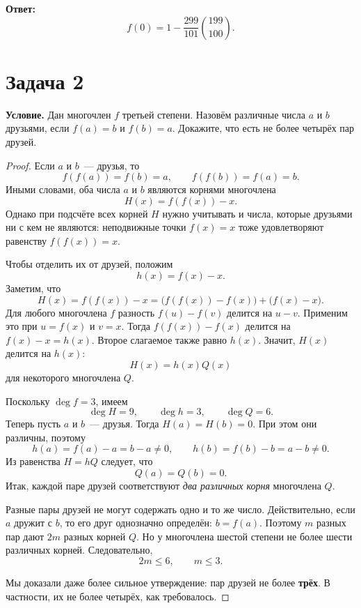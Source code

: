 \documentclass[12pt]{article}
\begin{document}
	\noindent
	\textbf{Ответ:}
	\[
		\boxed{f(0)=1-\frac{299}{101}\binom{199}{100}}.
	\]

	\section*{Задача 2}

	\noindent
	\textbf{Условие.} Дан многочлен $f$ третьей степени. Назовём различные
	числа $a$ и $b$ друзьями, если $f(a)=b$ и $f(b)=a$. Докажите, что есть
	не более четырёх пар друзей.

	\begin{proof}
		Если $a$ и $b$~--- друзья, то
		\[
			f(f(a))=f(b)=a,\qquad f(f(b))=f(a)=b.
		\]
		Иными словами, оба числа $a$ и $b$ являются корнями многочлена
		\[
			H(x)=f(f(x))-x.
		\]
		Однако при подсчёте всех корней $H$ нужно учитывать и числа,
		которые друзьями ни с кем не являются: неподвижные точки $f(x)=x$
		тоже удовлетворяют равенству $f(f(x))=x$.

		Чтобы отделить их от друзей, положим
		\[
			h(x)=f(x)-x.
		\]
		Заметим, что
		\[
			H(x)=f(f(x))-x
			 =\bigl(f(f(x))-f(x)\bigr)+\bigl(f(x)-x\bigr).
		\]
		Для любого многочлена $f$ разность $f(u)-f(v)$ делится на $u-v$.
		Применим это при $u=f(x)$ и $v=x$. Тогда
		$f(f(x))-f(x)$ делится на $f(x)-x=h(x)$. Второе слагаемое также
		равно $h(x)$. Значит, $H(x)$ делится на $h(x)$:
		\[
			H(x)=h(x)Q(x)
		\]
		для некоторого многочлена $Q$.

		Поскольку $\deg f=3$, имеем
		\[
			\deg H=9,\qquad \deg h=3,\qquad \deg Q=6.
		\]
		Теперь пусть $a$ и $b$~--- друзья. Тогда $H(a)=H(b)=0$. При этом
		они различны, поэтому
		\[
			h(a)=f(a)-a=b-a\ne0,\qquad
			h(b)=f(b)-b=a-b\ne0.
		\]
		Из равенства $H=hQ$ следует, что
		\[
			Q(a)=Q(b)=0.
		\]
		Итак, каждой паре друзей соответствуют \emph{два различных корня}
		многочлена $Q$.

		Разные пары друзей не могут содержать одно и то же число. Действительно,
		если $a$ дружит с $b$, то его друг однозначно определён:
		$b=f(a)$. Поэтому $m$ разных пар дают $2m$ разных корней $Q$.
		Но у многочлена шестой степени не более шести различных корней.
		Следовательно,
		\[
			2m\leqslant6,\qquad m\leqslant3.
		\]

		Мы доказали даже более сильное утверждение: пар друзей не более
		\textbf{трёх}. В частности, их не более четырёх, как требовалось.
	\end{proof}

\end{document}
